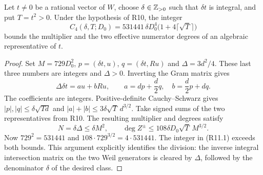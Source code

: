 \begin{theorem}
Let $t\ne0$ be a rational vector of $W$, choose $\delta\in\mathbb Z_{>0}$
such that $\delta t$ is integral, and put $T=t^2>0$. Under the hypothesis
of R10, the integer
\[
 C_4(\delta,T;D_0)=531441\,\delta D_0^4
              \bigl(1+4\lceil\sqrt T\rceil\bigr)
 \tag{R11.1}
\]
bounds the multiplier and the two effective numerator degrees of an
algebraic representative of $t$.
\end{theorem}
\begin{proof}
Set $M=729D_0^2$, $p=(\delta t,u)$, $q=(\delta t,Ru)$ and
$\Delta=3d^2/4$. These last three numbers are integers and $\Delta>0$.
Inverting the Gram matrix gives
\[
 \Delta\delta t=a u+bRu,\qquad
 a=dp+\frac d2q,\quad b=\frac d2p+dq.
\]
The coefficients are integers. Positive-definite Cauchy--Schwarz gives
$|p|,|q|\leq\delta\sqrt{Td}$ and
$|a|+|b|\leq3\delta\sqrt T\,d^{3/2}$.
Take signed sums of the two representatives from R10. The resulting
multiplier and degrees satisfy
\[
 N=\delta\Delta\leq\delta M^2,\qquad
 \deg Z^\pm\leq108\delta D_0\sqrt T\,M^{3/2}.
\]
Now $729^2=531441$ and $108\cdot729^{3/2}=4\cdot531441$.
The integer in (R11.1) exceeds both bounds. This argument explicitly
identifies the division: the inverse integral intersection matrix on
the two Weil generators is cleared by $\Delta$, followed by the
denominator $\delta$ of the desired class.
\end{proof}

